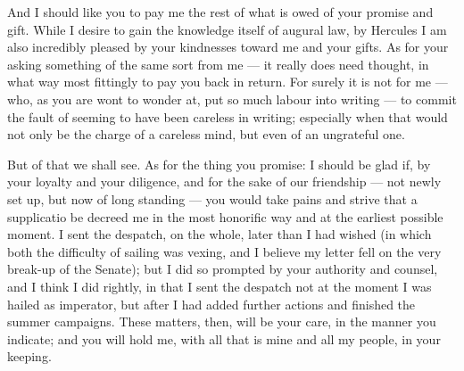  And I should like you to pay me the rest of what is owed of your promise and gift. While I desire to gain the knowledge itself of augural law, by Hercules I am also incredibly pleased by your kindnesses toward me and your gifts. As for your asking something of the same sort from me --- it really does need thought, in what way most fittingly to pay you back in return. For surely it is not for me --- who, as you are wont to wonder at, put so much labour into writing --- to commit the fault of seeming to have been careless in writing; especially when that would not only be the charge of a careless mind, but even of an ungrateful one.

 But of that we shall see. As for the thing you promise: I should be glad if, by your loyalty and your diligence, and for the sake of our friendship --- not newly set up, but now of long standing --- you would take pains and strive that a supplicatio be decreed me in the most honorific way and at the earliest possible moment. I sent the despatch, on the whole, later than I had wished (in which both the difficulty of sailing was vexing, and I believe my letter fell on the very break-up of the Senate); but I did so prompted by your authority and counsel, and I think I did rightly, in that I sent the despatch not at the moment I was hailed as imperator, but after I had added further actions and finished the summer campaigns. These matters, then, will be your care, in the manner you indicate; and you will hold me, with all that is mine and all my people, in your keeping.

